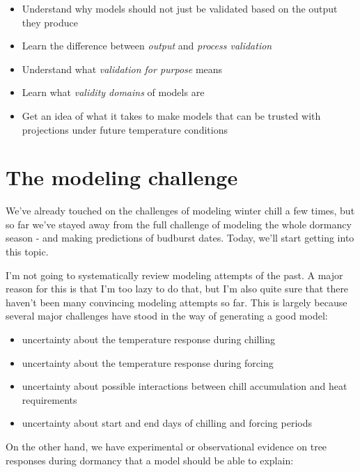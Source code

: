 \documentclass[
]{book}
\providecommand{\tightlist}{%
  \setlength{\itemsep}{0pt}\setlength{\parskip}{0pt}}
\begin{document}
\begin{itemize}
\tightlist
\item
  Understand why models should not just be validated based on the output they produce
\item
  Learn the difference between \emph{output} and \emph{process validation}
\item
  Understand what \emph{validation for purpose} means
\item
  Learn what \emph{validity domains} of models are
\item
  Get an idea of what it takes to make models that can be trusted with projections under future temperature conditions
\end{itemize}

\hypertarget{the-modeling-challenge}{%
\section{The modeling challenge}\label{the-modeling-challenge}}

We've already touched on the challenges of modeling winter chill a few times, but so far we've stayed away from the full challenge of modeling the whole dormancy season - and making predictions of budburst dates. Today, we'll start getting into this topic.

I'm not going to systematically review modeling attempts of the past. A major reason for this is that I'm too lazy to do that, but I'm also quite sure that there haven't been many convincing modeling attempts so far. This is largely because several major challenges have stood in the way of generating a good model:

\begin{itemize}
\tightlist
\item
  uncertainty about the temperature response during chilling
\item
  uncertainty about the temperature response during forcing
\item
  uncertainty about possible interactions between chill accumulation and heat requirements
\item
  uncertainty about start and end days of chilling and forcing periods
\end{itemize}

On the other hand, we have experimental or observational evidence on tree responses during dormancy that a model should be able to explain:
\end{document}
